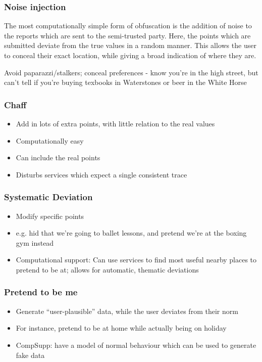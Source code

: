 \documentclass{IOS-Book-Article}     %
\newcommand{\tbox}[3][red]{{
\color{#1}\noindent{
   \fbox{\scriptsize{ {\bf #2} \textsl{#3}}}
   \vspace{2pt}
}
}}
\newcommand{\todo}[1]{\tbox{TODO:}{#1}}
\begin{document}
\subsubsection{Noise injection}

The most computationally simple form of obfuscation is the addition of noise to
the reports which are sent to the semi-trusted party. Here, the points which are
submitted deviate from the true values in a random manner. This allows the user
to conceal their exact location, while giving a broad indication of where they
are.

\todo{Why?} Avoid paparazzi/stalkers; conceal preferences - know you're in the
high street, but can't tell if you're buying texbooks in Waterstones or beer in
the White Horse

\subsubsection{Chaff}
\begin{itemize}
  \item Add in lots of extra points, with little relation to the real values
  \item Computationally easy
  \item Can include the real points
  \item Disturbs services which expect a single consistent trace
\end{itemize}

\subsubsection{Systematic Deviation}
\begin{itemize}
  \item Modify specific points
  \item e.g. hid that we're going to ballet lessons, and pretend we're at the
  boxing gym instead
  \item Computational support: Can use services to find most useful nearby
  places to pretend to be at; allows for automatic, thematic deviations
\end{itemize}

\subsubsection{Pretend to be me}
\begin{itemize}
  \item Generate ``user-plausible'' data, while the user deviates from their
  norm
  \item For instance, pretend to be at home while actually being on holiday
  \item CompSupp: have a model of normal behaviour which can be used to generate
  fake data
\end{itemize}
\end{document}
